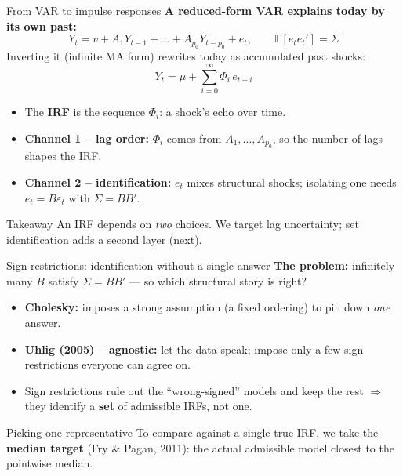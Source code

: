 \documentclass[aspectratio=169]{beamer}
\begin{document}
\begin{frame}{From VAR to impulse responses}
  \textbf{A reduced-form VAR explains today by its own past:}
  \[
    Y_t = v + A_1 Y_{t-1} + \dots + A_{p_0} Y_{t-p_0} + e_t,
    \qquad \mathbb{E}[e_t e_t'] = \Sigma
  \]
  Inverting it (infinite MA form) rewrites today as accumulated past shocks:
  \[
    Y_t = \mu + \sum_{i=0}^{\infty} \Phi_i\, e_{t-i}
  \]
  \begin{itemize}
    \item The \textbf{IRF} is the sequence $\Phi_i$: a shock's echo over time.
    \item \textbf{Channel 1 -- lag order:} $\Phi_i$ comes from $A_1,\dots,A_{p_0}$,
          so the number of lags shapes the IRF.
    \item \textbf{Channel 2 -- identification:} $e_t$ mixes structural shocks;
          isolating one needs $e_t = B\varepsilon_t$ with $\Sigma = BB'$.
  \end{itemize}
  \begin{block}{Takeaway}
    An IRF depends on \emph{two} choices. We target lag uncertainty;
    set identification adds a second layer (next).
  \end{block}
\end{frame}

\begin{frame}{Sign restrictions: identification without a single answer}
  \textbf{The problem:} infinitely many $B$ satisfy $\Sigma = BB'$
  --- so which structural story is right?
  \begin{itemize}
    \item \textbf{Cholesky:} imposes a strong assumption (a fixed ordering)
          to pin down \emph{one} answer.
    \item \textbf{Uhlig (2005) -- agnostic:} let the data speak; impose only a few
          sign restrictions everyone can agree on.
    \item Sign restrictions rule out the ``wrong-signed'' models and keep the rest
          $\Rightarrow$ they identify a \textbf{set} of admissible IRFs, not one.
  \end{itemize}
  \vspace{0.15cm}
  \begin{block}{Picking one representative}
    To compare against a single true IRF, we take the \textbf{median target}
    (Fry \& Pagan, 2011): the actual admissible model closest to the pointwise median.
  \end{block}
\end{frame}
\end{document}
